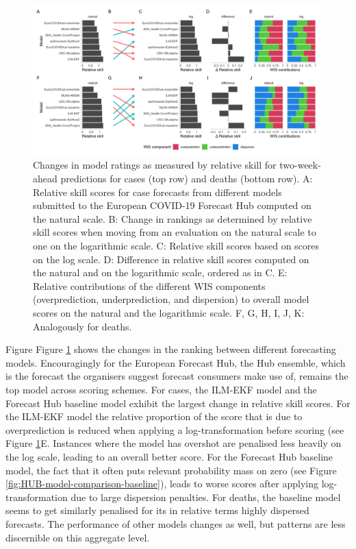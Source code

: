 \documentclass{article}
\begin{document}
\begin{figure}[h!]
    \centering
    \includegraphics[width=0.99\textwidth]{output/figures/HUB-pairwise-comparisons.png}
    \caption{Changes in model ratings as measured by relative skill for two-week-ahead predictions for cases (top row) and deaths (bottom row). A: Relative skill scores for case forecasts from different models submitted to the European COVID-19 Forecast Hub computed on the natural scale. B: Change in rankings as determined by relative skill scores when moving from an evaluation on the natural scale to one on the logarithmic scale. C: Relative skill scores based on scores on the log scale. D: Difference in relative skill scores computed on the natural and on the logarithmic scale, ordered as in C. E: Relative contributions of the different WIS components (overprediction, underprediction, and dispersion) to overall model scores on the natural and the logarithmic scale. F, G, H, I, J, K: Analogously for deaths.}
    \label{fig:HUB-rank-order}
\end{figure}

Figure Figure \ref{fig:HUB-rank-order} shows the changes in the ranking between different forecasting models. Encouragingly for the European Forecast Hub, the Hub ensemble, which is the forecast the organisers suggest forecast consumers make use of, remains the top model across scoring schemes. For cases, the ILM-EKF model and the Forecast Hub baseline model exhibit the largest change in relative skill scores. For the ILM-EKF model the relative proportion of the score that is due to overprediction is reduced when applying a log-transformation before scoring (see Figure \ref{fig:HUB-rank-order}E. Instances where the model has overshot are penalised less heavily on the log scale, leading to an overall better score. For the Forecast Hub baseline model, the fact that it often puts relevant probability mass on zero (see Figure \ref{fig:HUB-model-comparison-baseline}), leads to worse scores after applying log-transformation due to large dispersion penalties. For deaths, the baseline model seems to get similarly penalised for its in relative terms highly dispersed forecasts. The performance of other models changes as well, but patterns are less discernible on this aggregate level. 
\end{document}
